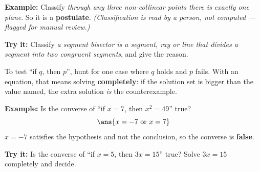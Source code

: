 \documentclass[12pt]{article}
\begin{document}
\begin{examplebox}
\textbf{Example:} Classify \emph{through any three non-collinear points there is
exactly one plane}.
So it is a \textbf{postulate}. \emph{(Classification is read by a person, not
computed --- flagged for manual review.)}
\end{examplebox}

\begin{tryitbox}
\textbf{Try it:} Classify \emph{a segment bisector is a segment, ray or line
that divides a segment into two congruent segments}, and give the reason.\\[2pt]
\end{tryitbox}


\begin{formulabox}
To test ``if $q$, then $p$'', hunt for one case where $q$ holds and $p$ fails.
With an equation, that means solving \textbf{completely}: if the solution set is
bigger than the value named, the extra solution \emph{is} the counterexample.
\end{formulabox}

\begin{examplebox}
\textbf{Example:} Is the converse of ``if $x = 7$, then $x^2 = 49$'' true?
\[ \ans{x = -7 \text{ or } x = 7} \]
$x = -7$ satisfies the hypothesis and not the conclusion, so the converse is
\textbf{false}.
\end{examplebox}

\begin{tryitbox}
\textbf{Try it:} Is the converse of ``if $x = 5$, then $3x = 15$'' true? Solve
$3x = 15$ completely and decide.\\[2pt]
\end{tryitbox}

\end{document}
